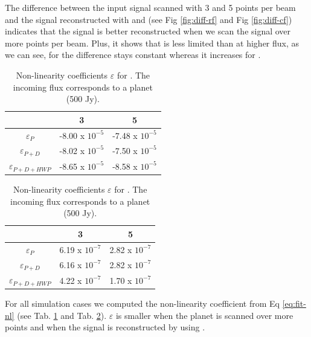 The difference between the input signal scanned with 3 and 5 points per beam and the signal reconstructed with \rf and \cf (see Fig \ref{fig:diff-rf} and Fig \ref{fig:diff-cf}) indicates that the signal is better reconstructed when we scan the signal over more points per beam. Plus, it shows that \cf is less limited than \rf at higher flux, as we can see, for \cf the difference stays constant whereas it increases for \rf. 

\begin{table}[h!]
\center
	\begin{tabular}{|c|c|c|}
  	\hline
 	\backslashbox{$\varepsilon$}{$npts/fwhm$} & 3 & 5 \\
	\hline
 	 $\varepsilon_{P}$ & -8.00 x $10^{-5}$ & -7.48 x $10^{-5}$ \\
  	\hline
 	$\varepsilon_{P+D}$ & -8.02 x $10^{-5}$ & -7.50 x $10^{-5}$ \\
  	\hline
  	$\varepsilon_{P+D+HWP}$ & -8.65 x $10^{-5}$ & -8.58 x $10^{-5}$ \\
	\hline
	\end{tabular} 
\caption{Non-linearity coefficients $\varepsilon$ for \rf. The incoming flux corresponds to a planet (500 Jy).}
\label{tab:eps-planet-rf}
\end{table} 

\begin{table}[h!]
\center
	\begin{tabular}{|c|c|c|}
  	\hline
 	\backslashbox{$\varepsilon$}{$npts/fwhm$} & 3 & 5 \\
	\hline
 	$\varepsilon_{P}$ & 6.19 x $10^{-7}$ & 2.82 x $10^{-7}$ \\
  	\hline
 	$\varepsilon_{P+D}$ & 6.16 x $10^{-7}$ & 2.82 x $10^{-7}$ \\
  	\hline
  	$\varepsilon_{P+D+HWP}$ & 4.22 x $10^{-7}$ & 1.70 x $10^{-7}$ \\
	\hline
	\end{tabular} 
\caption{Non-linearity coefficients $\varepsilon$ for \cf. The incoming flux corresponds to a planet (500 Jy).}
\label{tab:eps-planet-cf}
\end{table} 

For all simulation cases we computed the non-linearity coefficient \eps from Eq \ref{eq:fit-nl} (see Tab. \ref{tab:eps-planet-rf} and Tab. \ref{tab:eps-planet-cf}). $\varepsilon$ is smaller when the planet is scanned over more points and when the signal is reconstructed by using \cf. 

